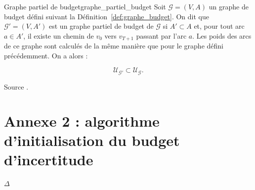 \documentclass[12pt, a4paper, twoside]{article}
\numberwithin{equation}{section}
\begin{document}
    \begin{definition}{Graphe partiel de budget}{graphe_partiel_budget}
		Soit $\mathcal{G}=(V, A)$ un graphe de budget défini suivant la Définition~\ref{def:graphe_budget}. On dit que $\mathcal{G}'=(V, A')$ est un graphe partiel de budget de $\mathcal{G}$ si $A'\subset A$ et, pour tout arc $a\in A'$, il existe un chemin de $v_0$ vers $v_{T+1}$ passant par l'arc $a$. Les poids des arcs de ce graphe sont calculés de la même manière que pour le graphe défini précédemment. On a alors :

        \[
            \mathcal{U}_{\mathcal{G}'}\subset \mathcal{U}_{\mathcal{G}}.
        \]

        {\footnotesize
            \hrulefill
        
            Source \cite{portoleauTHESIS}.
        }
	\end{definition}


    \clearpage
    \section{Annexe 2 : algorithme d'initialisation du budget d'incertitude}
    \label{section:annexe:gamma_proportional}
    
    \begin{algorithm}[H]
        \caption{Proportional initialization of uncertainty bounds}
        \label{alg:gamma_proportional}
    
            
        
        \Return $\Delta$\;
    \end{algorithm}
\end{document}
